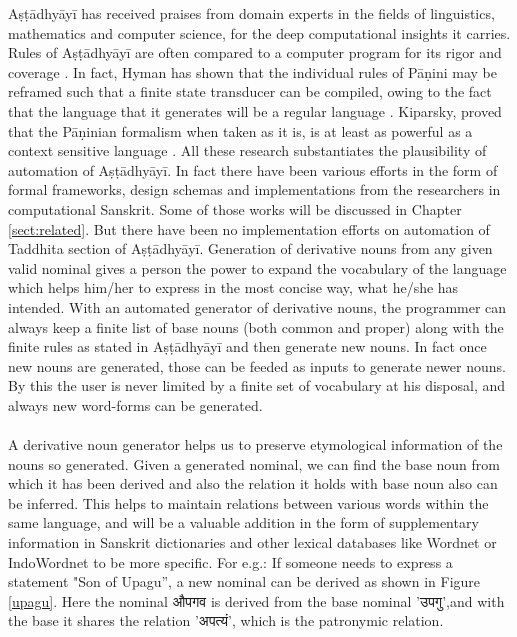 \documentclass[a4paper,11pt,twoside,openright]{report}
\begin{document}
Aṣṭādhyāyī has received praises from domain experts in the fields of linguistics, mathematics and computer science, for the deep computational insights it carries. Rules of Aṣṭādhyāyī are often compared to a computer program for its rigor and coverage \cite{goyal07}. In fact, Hyman has shown that the individual rules of Pāṇini may be reframed such that a finite state transducer can be compiled, owing to the fact that the language that it generates will be a regular language \cite{hyman07}. Kiparsky, proved that the Pāṇinian formalism when taken as it is, is at least as powerful as a context sensitive language \cite{kiparsky12}. All these research substantiates
the plausibility of automation of Aṣṭādhyāyī. In fact there have been various efforts in the
form of formal frameworks, design schemas and implementations from the researchers in
computational Sanskrit. Some of those works will be discussed in Chapter \ref{sect:related}. But there have been no implementation efforts on automation of Taddhita section of Aṣṭādhyāyī.  Generation of derivative nouns from any given valid nominal gives a person the power to
expand the vocabulary of the language which helps him/her to express in the most concise way, what he/she has intended. With an automated generator of derivative nouns, the programmer can always keep a finite list of base nouns (both common and proper) along with the finite rules as stated in Aṣṭādhyāyī and then generate new nouns. In fact once new nouns are generated, those can be feeded as inputs to generate newer nouns. By this the user is never limited by a finite set of vocabulary at his disposal, and always new word-forms can be generated.
\\ \\
A derivative noun generator helps us to preserve etymological information of the nouns
so generated. Given a generated nominal, we can find the base noun from which it has
been derived and also the relation it holds with base noun also can be inferred. This helps
to maintain relations between various words within the same language, and will be a
valuable addition in the form of supplementary information in Sanskrit dictionaries and
other lexical databases like Wordnet or IndoWordnet \cite{pushpak10} to be more specific. For e.g.: If someone needs to express a statement "Son of Upagu”, a new nominal can be derived as
shown in Figure \ref{upagu}. Here the nominal {\skt औपगव} is derived from the base nominal {\skt 'उपगु}',and with the base it shares the relation {\skt 'अपत्यं'}, which is the patronymic relation.
\end{document}
